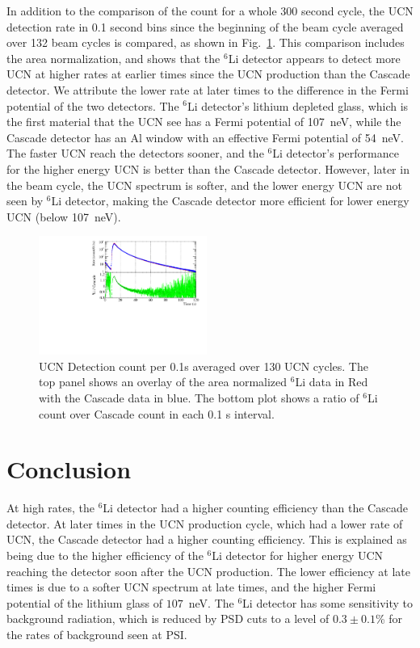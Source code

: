 \documentclass[letter,twocolumn,preprint,3p]{elsarticle}
\begin{document}
In addition to the comparison of the count for a whole 300 second
cycle, the UCN detection rate in 0.1 second bins since the beginning
of the beam cycle averaged over 132 beam cycles is compared, as shown in
Fig.~\ref{fig:averagedRate}.  This comparison includes the area
normalization, and shows that the $^{6}$Li detector appears to detect
more UCN at higher rates at earlier times since the UCN production
than the Cascade detector.  We attribute the lower rate at later times
to the difference in the Fermi potential of the two detectors.  The
$^6$Li detector's lithium depleted glass, which is the first material
that the UCN see has a Fermi potential of 107~neV, while the Cascade
detector has an Al window with an effective Fermi potential of 54~neV.
The faster UCN reach the detectors sooner, and the $^6$Li detector's
performance for the higher energy UCN is better than the Cascade
detector.  However, later in the beam cycle, the UCN spectrum is
softer, and the lower energy UCN are not seen by $^{6}$Li detector,
making the Cascade detector more efficient for lower energy UCN (below
107~neV).

\begin{figure}[!htpb]
\centering \includegraphics[width = 0.49\textwidth]{figures/cascade_to_li_130cycleavg.pdf}
\caption{UCN Detection count per 0.1s averaged over 130 UCN cycles.
  The top panel shows an overlay of the area normalized $^6$Li data in
  Red with the Cascade data in blue.  The bottom plot shows a ratio of
  $^6$Li count over Cascade count in each 0.1 s interval. }
\label{fig:averagedRate}
\end{figure}



\section{Conclusion}

At high rates, the $^6$Li detector had a higher counting efficiency
than the Cascade detector.  At later times in the UCN production
cycle, which had a lower rate of UCN, the Cascade detector had a
higher counting efficiency.  This is explained as being due to the
higher efficiency of the $^{6}$Li detector for higher energy UCN
reaching the detector soon after the UCN production.  The lower
efficiency at late times is due to a softer UCN spectrum at late
times, and the higher Fermi potential of the lithium glass of
$107$~neV.  The $^6$Li detector has some sensitivity to background
radiation, which is reduced by PSD cuts to a level of $0.3\pm0.1$\%
for the rates of background seen at PSI.
\end{document}
